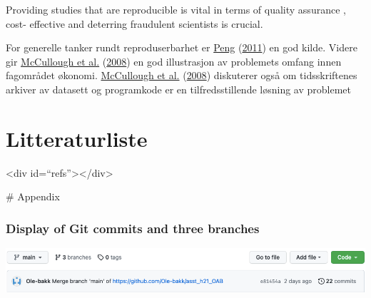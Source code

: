 \documentclass[
  12pt,
  norsk,
]{article}
\begin{document}
Providing studies that are reproducible is vital in terms of quality
assurance , cost- effective and deterring fraudulent scientists is
crucial.

For generelle tanker rundt reproduserbarhet er
\protect\hyperlink{ref-peng2011}{Peng}
(\protect\hyperlink{ref-peng2011}{2011}) en god kilde. Videre gir
\protect\hyperlink{ref-mccullough2008}{McCullough et al.}
(\protect\hyperlink{ref-mccullough2008}{2008}) en god illustrasjon av
problemets omfang innen fagområdet økonomi.
\protect\hyperlink{ref-mccullough2008}{McCullough et al.}
(\protect\hyperlink{ref-mccullough2008}{2008}) diskuterer også om
tidsskriftenes arkiver av datasett og programkode er en
tilfredsstillende løsning av problemet

\hypertarget{litteraturliste}{%
\section{Litteraturliste}\label{litteraturliste}}

\textless div id=``refs''\textgreater\textless/div\textgreater{}

\# Appendix

\hypertarget{display-of-git-commits-and-three-branches}{%
\subsubsection{Display of Git commits and three
branches}\label{display-of-git-commits-and-three-branches}}

\includegraphics{images/paste-7A7BFE4C.png}
\end{document}
